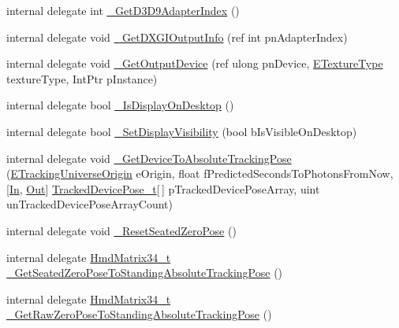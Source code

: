 \begin{DoxyCompactItemize}
\item 
internal delegate int \mbox{\hyperlink{struct_valve_1_1_v_r_1_1_i_v_r_system_af8628eb30b5b12b64585d57ebc093ff9}{\+\_\+\+Get\+D3\+D9\+Adapter\+Index}} ()
\item 
internal delegate void \mbox{\hyperlink{struct_valve_1_1_v_r_1_1_i_v_r_system_ab24a286fab0641489f5da8a338858169}{\+\_\+\+Get\+D\+X\+G\+I\+Output\+Info}} (ref int pn\+Adapter\+Index)
\item 
internal delegate void \mbox{\hyperlink{struct_valve_1_1_v_r_1_1_i_v_r_system_a7b0363d609497bbe2b11d2af5ff2fc07}{\+\_\+\+Get\+Output\+Device}} (ref ulong pn\+Device, \mbox{\hyperlink{namespace_valve_1_1_v_r_a9481de640e411eef49c2f3fdca82eaa3}{E\+Texture\+Type}} texture\+Type, Int\+Ptr p\+Instance)
\item 
internal delegate bool \mbox{\hyperlink{struct_valve_1_1_v_r_1_1_i_v_r_system_a82b26bcb84c59e3b886653e6f52c9fdf}{\+\_\+\+Is\+Display\+On\+Desktop}} ()
\item 
internal delegate bool \mbox{\hyperlink{struct_valve_1_1_v_r_1_1_i_v_r_system_a97b502df669ebd8f271bea132cd15eed}{\+\_\+\+Set\+Display\+Visibility}} (bool b\+Is\+Visible\+On\+Desktop)
\item 
internal delegate void \mbox{\hyperlink{struct_valve_1_1_v_r_1_1_i_v_r_system_aaea53504ce1e2a5c54baaaa6d1ad2d40}{\+\_\+\+Get\+Device\+To\+Absolute\+Tracking\+Pose}} (\mbox{\hyperlink{namespace_valve_1_1_v_r_a29be99a3c2f780157bd490db06a7f12f}{E\+Tracking\+Universe\+Origin}} e\+Origin, float f\+Predicted\+Seconds\+To\+Photons\+From\+Now, \mbox{[}\mbox{\hyperlink{namespace_valve_1_1_v_r_a1e6192cb5ddaf204afab87ccb5728780aefeb369cccbd560588a756610865664c}{In}}, \mbox{\hyperlink{namespace_valve_1_1_v_r_a1e6192cb5ddaf204afab87ccb5728780a7c147cda9e49590f6abe83d118b7353b}{Out}}\mbox{]} \mbox{\hyperlink{struct_valve_1_1_v_r_1_1_tracked_device_pose__t}{Tracked\+Device\+Pose\+\_\+t}}\mbox{[}$\,$\mbox{]} p\+Tracked\+Device\+Pose\+Array, uint un\+Tracked\+Device\+Pose\+Array\+Count)
\item 
internal delegate void \mbox{\hyperlink{struct_valve_1_1_v_r_1_1_i_v_r_system_ae73e4e8327964bc0c9947bebed6f41fd}{\+\_\+\+Reset\+Seated\+Zero\+Pose}} ()
\item 
internal delegate \mbox{\hyperlink{struct_valve_1_1_v_r_1_1_hmd_matrix34__t}{Hmd\+Matrix34\+\_\+t}} \mbox{\hyperlink{struct_valve_1_1_v_r_1_1_i_v_r_system_af45048703eb614b2aa0e3a306838b131}{\+\_\+\+Get\+Seated\+Zero\+Pose\+To\+Standing\+Absolute\+Tracking\+Pose}} ()
\item 
internal delegate \mbox{\hyperlink{struct_valve_1_1_v_r_1_1_hmd_matrix34__t}{Hmd\+Matrix34\+\_\+t}} \mbox{\hyperlink{struct_valve_1_1_v_r_1_1_i_v_r_system_acca513b3beff9bcf5c4e6cc4cb367b64}{\+\_\+\+Get\+Raw\+Zero\+Pose\+To\+Standing\+Absolute\+Tracking\+Pose}} ()

\end{DoxyCompactItemize}
